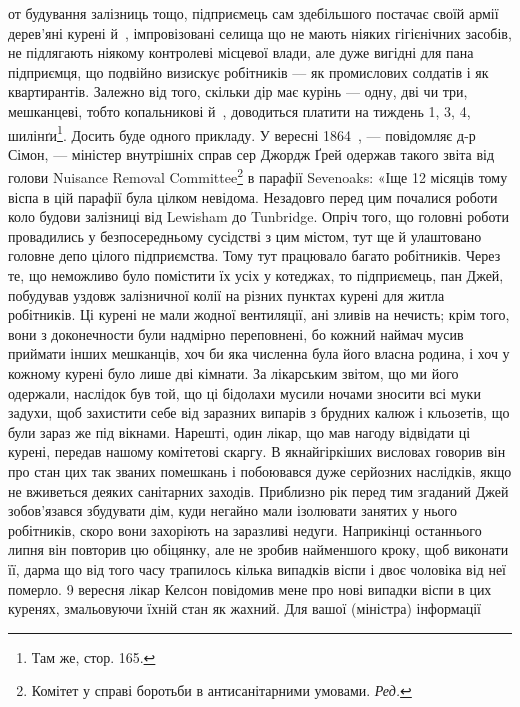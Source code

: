 \parcont{}  %
от будування залізниць тощо, підприємець сам здебільшого постачає
своїй армії дерев’яні курені й~, імпровізовані селища
що не мають ніяких гігієнічних засобів, не підлягають ніякому
контролеві місцевої влади, але дуже вигідні для пана підприємця,
що подвійно визискує робітників — як промислових солдатів
і як квартирантів. Залежно від того, скільки дір має курінь —
одну, дві чи три, мешканцеві, тобто копальникові й~, доводиться
платити на тиждень 1, 3, 4, шилінґи\footnote{
Там же, стор. 165.
}. Досить буде одного
прикладу. У вересні 1864~, — повідомляє д-р Сімон, — міністер
внутрішніх справ сер Джордж Ґрей одержав такого звіта
від голови Nuisance Removal Committee\footnote*{
Комітет у справі боротьби в антисанітарними умовами. \emph{Ред.}
} в парафії Sevenoaks:
«Іще 12 місяців тому віспа в цій парафії була цілком невідома.
Незадовго перед цим почалися роботи коло будови залізниці
від Lewisham до Tunbridge. Опріч того, що головні роботи провадились
у безпосередньому сусідстві з цим містом, тут ще й
улаштовано головне депо цілого підприємства. Тому тут працювало
багато робітників. Через те, що неможливо було помістити
їх усіх у котеджах, то підприємець, пан Джей, побудував уздовж
залізничної колії на різних пунктах курені для житла робітників.
Ці курені не мали жодної вентиляції, ані зливів на нечисть;
крім того, вони з доконечности були надмірно переповнені,
бо кожний наймач мусив приймати інших мешканців, хоч би
яка численна була його власна родина, і хоч у кожному курені
було лише дві кімнати. За лікарським звітом, що ми його одержали,
наслідок був той, що ці бідолахи мусили ночами зносити
всі муки задухи, щоб захистити себе від заразних випарів з брудних
калюж і кльозетів, що були зараз же під вікнами. Нарешті,
один лікар, що мав нагоду відвідати ці курені, передав нашому
комітетові скаргу. В якнайгіркіших висловах говорив він про
стан цих так званих помешкань і побоювався дуже серйозних
наслідків, якщо не вживеться деяких санітарних заходів. Приблизно
рік перед тим згаданий Джей зобов’язався збудувати дім,
куди негайно мали ізолювати занятих у нього робітників, скоро
вони захоріють на заразливі недуги. Наприкінці останнього
липня він повторив цю обіцянку, але не зробив найменшого
кроку, щоб виконати її, дарма що від того часу трапилось кілька
випадків віспи і двоє чоловіка від неї померло. 9 вересня лікар
Келсон повідомив мене про нові випадки віспи в цих куренях,
змальовуючи їхній стан як жахний. Для вашої (міністра) інформації
